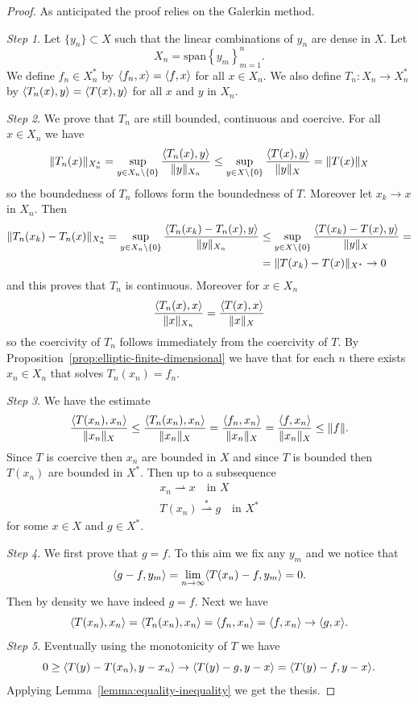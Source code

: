 \documentclass[a4paper,10pt,oneside]{amsbook}
\numberwithin{section}{chapter}
\numberwithin{equation}{chapter}
\theoremstyle{definition}
\DeclarePairedDelimiter{\norm}{\lVert}{\rVert}
\DeclarePairedDelimiter{\dual}{\langle}{\rangle}
\begin{document}
\begin{proof}
As anticipated the proof relies on the Galerkin method.

\emph{Step 1}. Let $\{y_n\}\subset X$ such that the linear combinations of $y_n$ are dense in $X$. Let
\[
X_n=\text{span}\left\{y_m\right\}_{m=1}^n.
\]
We define $f_n\in X_n^*$ by $\dual{f_n,x}=\dual{f,x}$ for all $x\in X_n$. We also define $T_n\colon X_n\to X_n^*$ by $\dual{T_n(x),y}=\dual{T(x),y}$ for all $x$ and $y$ in $X_n$.

\emph{Step 2}. We prove that $T_n$ are still bounded, continuous and coercive. For all $x\in X_n$ we have
\[
\norm{T_n(x)}_{X_n^*}=\sup_{y\in X_n\setminus\{0\}}\frac{\dual{T_n(x),y}}{\norm{y}_{X_n}}\le\sup_{y\in X\setminus\{0\}}\frac{\dual{T(x),y}}{\norm{y}_X}=\norm{T(x)}_X
\]
so the boundedness of $T_n$ follows form the boundedness of $T$. Moreover let $x_k\to x$ in $X_n$. Then
\[
\begin{split}
\norm{T_n(x_k)-T_n(x)}_{X_n^*}=\sup_{y\in X_n\setminus\{0\}}\frac{\dual{T_n(x_k)-T_n(x),y}}{\norm{y}_{X_n}}&\le\sup_{y\in X\setminus\{0\}}\frac{\dual{T(x_k)-T(x),y}}{\norm{y}_X}=\\
&=\norm{T(x_k)-T(x)}_{X^*}\to0
\end{split}
\]
and this proves that $T_n$ is continuous. Moreover for $x\in X_n$
\[
\frac{\dual{T_n(x),x}}{\norm{x}_{X_n}}=\frac{\dual{T(x),x}}{\norm{x}_{X}}
\]
so the coercivity of $T_n$ follows immediately from the coercivity of $T$. By Proposition~\ref{prop:elliptic-finite-dimensional} we have that for each $n$ there exists $x_n\in X_n$ that solves $T_n(x_n)=f_n$.

\emph{Step 3}. We have the estimate
\[
\frac{\dual{T(x_n),x_n}}{\norm{x_n}_X}\le\frac{\dual{T_n(x_n),x_n}}{\norm{x_n}_X}=\frac{\dual{f_n,x_n}}{\norm{x_n}_X}=\frac{\dual{f,x_n}}{\norm{x_n}_X}\le\norm{f}.
\]
Since $T$ is coercive then $x_n$ are bounded in $X$ and since $T$ is bounded then $T(x_n)$ are bounded in $X^*$. Then up to a subsequence
\begin{gather*}
x_n\rightharpoonup x\quad\text{in $X$} \\
T(x_n)\overset{*}{\rightharpoonup}g\quad\text{in $X^*$}
\end{gather*}
for some $x\in X$ and $g\in X^*$.

\emph{Step 4}. We first prove that $g=f$. To this aim we fix any $y_m$ and we notice that
\[
\dual{g-f,y_m}=\lim_{n\to\infty}\dual{T(x_n)-f,y_m}=0.
\]
Then by density we have indeed $g=f$. Next we have
\[
\dual{T(x_n),x_n}=\dual{T_n(x_n),x_n}=\dual{f_n,x_n}=\dual{f,x_n}\to\dual{g,x}.
\]
\emph{Step 5}. Eventually using the monotonicity of $T$ we have
\[
0\ge\dual{T(y)-T(x_n),y-x_n}\to\dual{T(y)-g,y-x}=\dual{T(y)-f,y-x}.
\]
Applying Lemma~\ref{lemma:equality-inequality} we get the thesis.
\end{proof}
\end{document}

